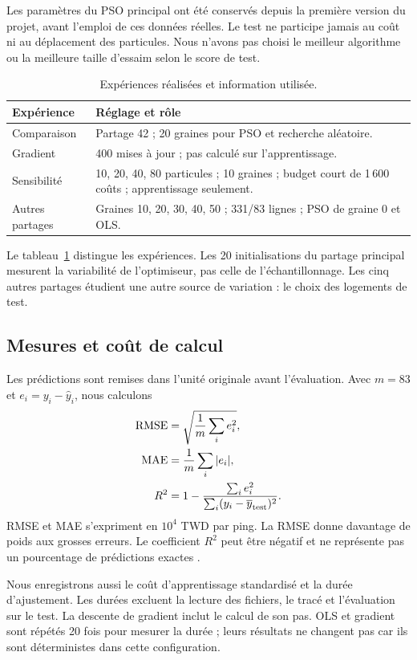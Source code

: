 \documentclass[conference,a4paper]{IEEEtran}
\begin{document}
Les paramètres du PSO principal ont été conservés depuis la première version du projet, avant l'emploi de ces données réelles. Le test ne participe jamais au coût ni au déplacement des particules. Nous n'avons pas choisi le meilleur algorithme ou la meilleure taille d'essaim selon le score de test.
\begin{table}[t]\centering\small
\caption{Expériences réalisées et information utilisée.}\label{tab:protocole}
\begin{tabular}{p{}p{}}\toprule
Expérience & Réglage et rôle\\\midrule
Comparaison & Partage 42 ; 20 graines pour PSO et recherche aléatoire.\\
Gradient & 400 mises à jour ; pas calculé sur l'apprentissage.\\
Sensibilité & 10, 20, 40, 80 particules ; 10 graines ; budget court de 1\,600 coûts ; apprentissage seulement.\\
Autres partages & Graines 10, 20, 30, 40, 50 ; 331/83 lignes ; PSO de graine 0 et OLS.\\\bottomrule
\end{tabular}
\end{table}
Le tableau~\ref{tab:protocole} distingue les expériences. Les 20 initialisations du partage principal mesurent la variabilité de l'optimiseur, pas celle de l'échantillonnage. Les cinq autres partages étudient une autre source de variation : le choix des logements de test.

\subsection{Mesures et coût de calcul}
Les prédictions sont remises dans l'unité originale avant l'évaluation. Avec $m=83$ et $e_i=y_i-\widehat y_i$, nous calculons
\begin{align}
\mathrm{RMSE}&=\sqrt{\frac{1}{m}\sum_i e_i^2},\\
\mathrm{MAE}&=\frac{1}{m}\sum_i|e_i|,\\
R^2&=1-\frac{\sum_i e_i^2}{\sum_i(y_i-\overline y_{\rm test})^2}.
\end{align}
RMSE et MAE s'expriment en $10^4$ TWD par ping. La RMSE donne davantage de poids aux grosses erreurs. Le coefficient $R^2$ peut être négatif et ne représente pas un pourcentage de prédictions exactes \cite{r2}.

Nous enregistrons aussi le coût d'apprentissage standardisé et la durée d'ajustement. Les durées excluent la lecture des fichiers, le tracé et l'évaluation sur le test. La descente de gradient inclut le calcul de son pas. OLS et gradient sont répétés 20 fois pour mesurer la durée ; leurs résultats ne changent pas car ils sont déterministes dans cette configuration.
\end{document}
